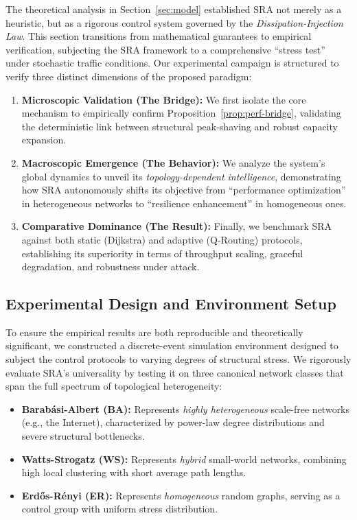 \documentclass{ccjnl}
\begin{document}
The theoretical analysis in Section~\ref{sec:model} established SRA not merely as a heuristic, but as a rigorous control system governed by the \textit{Dissipation-Injection Law}. 
This section transitions from mathematical guarantees to empirical verification, subjecting the SRA framework to a comprehensive ``stress test'' under stochastic traffic conditions.
Our experimental campaign is structured to verify three distinct dimensions of the proposed paradigm:
\begin{enumerate}
    \item \textbf{Microscopic Validation (The Bridge):} We first isolate the core mechanism to empirically confirm Proposition~\ref{prop:perf-bridge}, validating the deterministic link between structural peak-shaving and robust capacity expansion.
    \item \textbf{Macroscopic Emergence (The Behavior):} We analyze the system's global dynamics to unveil its \textit{topology-dependent intelligence}, demonstrating how SRA autonomously shifts its objective from ``performance optimization'' in heterogeneous networks to ``resilience enhancement'' in homogeneous ones.
    \item \textbf{Comparative Dominance (The Result):} Finally, we benchmark SRA against both static (Dijkstra) and adaptive (Q-Routing) protocols, establishing its superiority in terms of throughput scaling, graceful degradation, and robustness under attack.
\end{enumerate}

\subsection{Experimental Design and Environment Setup}
\label{subsec:sim_setup}

To ensure the empirical results are both reproducible and theoretically significant, we constructed a discrete-event simulation environment designed to subject the control protocols to varying degrees of structural stress.
We rigorously evaluate SRA's universality by testing it on three canonical network classes that span the full spectrum of topological heterogeneity:
\begin{itemize}
    \item \textbf{Barabási-Albert (BA):} Represents \textit{highly heterogeneous} scale-free networks (e.g., the Internet), characterized by power-law degree distributions and severe structural bottlenecks.
    \item \textbf{Watts-Strogatz (WS):} Represents \textit{hybrid} small-world networks, combining high local clustering with short average path lengths.
    \item \textbf{Erd\H{o}s-Rényi (ER):} Represents \textit{homogeneous} random graphs, serving as a control group with uniform stress distribution.
\end{itemize}
\end{document}
